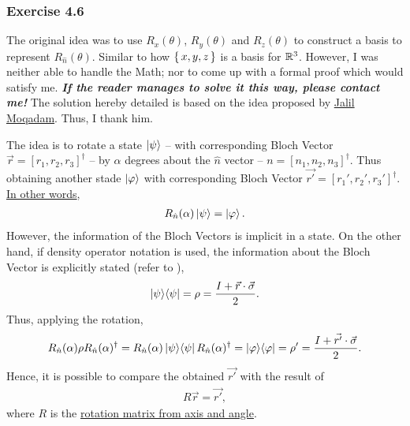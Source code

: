 \subsubsection{Exercise 4.6}
The original idea was to use $R_x(\theta)$, $R_y(\theta)$ and $R_z(\theta)$
to construct a basis to represent $R_{\hat n}(\theta)$.
Similar to how $\set{x, y, z}$ is a basis for $\mathbb{R}^3$.
However, I was neither able to handle the Math;
nor to come up with a formal proof which would satisfy me.
\emph{\textbf{If the reader manages to solve it this way, please contact me!}}
The solution hereby detailed is based on the idea proposed by
\href{https://scholar.google.com.br/citations?user=AzhOiFAAAAAJ&hl}
{Jalil Moqadam}. Thus, I thank him.

The idea is to rotate a state $\ket\psi$ --
with corresponding Bloch Vector $\vec{r} = [r_1, r_2, r_3]^\dagger$ --
by $\alpha$ degrees about the $\hat n$ vector --
$n = [n_1, n_2, n_3]^\dagger$.
Thus obtaining another stade $\ket \varphi$ with corresponding
Bloch Vector $\vec{r'} = [r_1', r_2', r_3']^\dagger$.
\href{https://www.youtube.com/watch?v=DtL_giO-EB8#t=4m3.5s}{In other words},
\begin{align}
    R_{\hat n}(\alpha) \ket \psi = \ket \varphi .
\end{align}
However, the information of the Bloch Vectors is implicit in a state.
On the other hand, if density operator notation is used,
the information about the Bloch Vector is explicitly stated
(refer to ),
\begin{align}
    \mathop{\mathinner{ |{\psi}\rangle \langle{\psi}|}} = \rho = \frac{I + \vec{r} \cdot \vec{\sigma}}{2}.
\end{align}
Thus, applying the rotation,
\begin{align}
    R_{\hat n}(\alpha) \rho R_{\hat n}(\alpha)^\dagger =
    R_{\hat n}(\alpha) \mathop{\mathinner{ |{\psi}\rangle \langle{\psi}|}} R_{\hat n}(\alpha)^\dagger =
    \mathop{\mathinner{ |{\varphi}\rangle \langle{\varphi}|}}  =
    \rho' =
    \frac{I + \vec{r'}\cdot\vec{\sigma}}{2} .
\end{align}
Hence, it is possible to compare the obtained $\vec{r'}$ with
the result of
\begin{align}
    R \vec r = \vec{r'},
    \label{eq:nielsen-and-chuang-exercise-4-6-assert}
\end{align}
where $R$ is the
\href{https://en.wikipedia.org/wiki/Rotation_matrix#Rotation_matrix_from_axis_and_angle}
{rotation matrix from axis and angle}.


